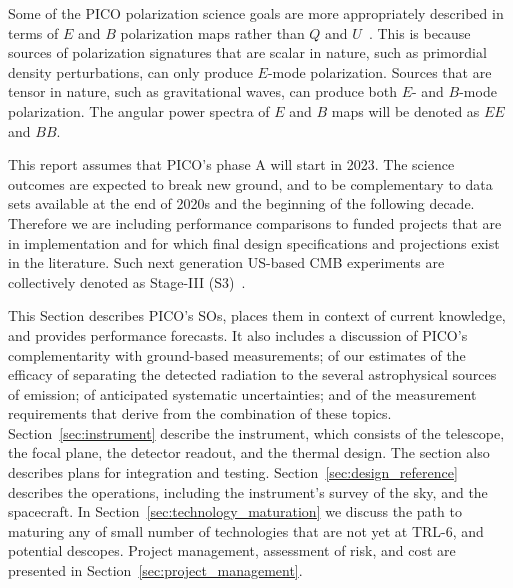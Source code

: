\documentclass[PICOReport.tex]{subfiles}
\begin{document}

Some of the PICO polarization science goals are more appropriately described in terms of $E$ and $B$ polarization maps rather than $Q$ and $U$~\cite{zaldarriaga97b,kamionkowski98}. This is because sources of polarization signatures that are scalar in nature, such as primordial density perturbations, can only produce $E$-mode polarization. Sources that are tensor in nature, such as gravitational waves, can produce both $E$- and $B$-mode polarization. The angular power spectra of $E$ and $B$ maps will be denoted as $EE$ and $BB$.

This report assumes that PICO's phase A will start in 2023. The science outcomes are expected to break new ground, and to be complementary to data sets available at the end of 2020s and the beginning of the following decade. Therefore we are including performance comparisons to funded projects that are in implementation and for which final design specifications and projections exist in the literature. Such next generation US-based CMB experiments are collectively denoted as Stage-III (S3)~\citep{advancedact,spt3g,so,class_overview,biceparray,spider,piper}. 

This Section describes PICO's \ac{SOs}, places them in context of current knowledge, and provides performance forecasts. It also includes a discussion of PICO's complementarity with ground-based measurements; of our estimates of the efficacy of separating the detected radiation to the several astrophysical sources of emission; of anticipated systematic uncertainties; and of the measurement requirements that derive from the combination of these topics.  Section~\ref{sec:instrument} describe the instrument, which consists of the telescope, the focal plane, the detector readout, and the thermal design. The section also describes plans for integration and testing. Section~\ref{sec:design_reference} describes the operations, including the instrument's survey of the sky, and the spacecraft. In Section~\ref{sec:technology_maturation} we discuss the path to maturing any of small number of technologies that are not yet at TRL-6, and potential descopes. Project management, assessment of risk, and cost are presented in Section~\ref{sec:project_management}. 


\end{document}
